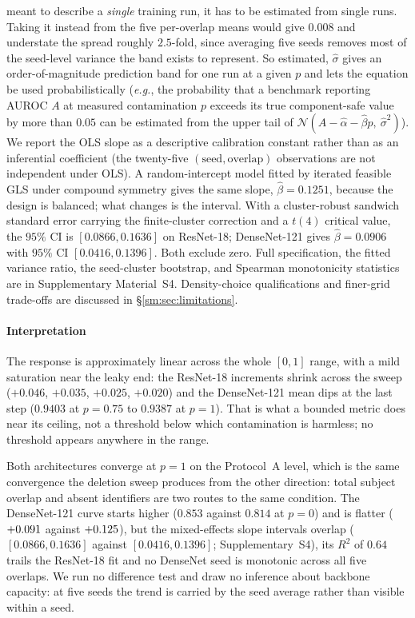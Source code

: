 \documentclass[11pt]{article}
\newcommand{\eg}{\textit{e.g.},}
\begin{document}
meant to describe a \emph{single} training run, it has to be estimated
from single runs. Taking it instead from the five per-overlap means
would give $0.008$ and understate the spread roughly $2.5$-fold, since
averaging five seeds removes most of the seed-level variance the band
exists to represent. So estimated, $\widehat{\sigma}$ gives an
order-of-magnitude prediction band for one run at a given $p$ and lets
the equation be used probabilistically (\eg{} the probability that a benchmark reporting
AUROC $A$ at measured contamination $p$ exceeds its true
component-safe value by more than $0.05$ can be estimated from the
upper tail of $\mathcal{N}(A - \widehat{\alpha} - \widehat{\beta}p,\
\widehat{\sigma}^2)$).
We report the OLS slope as a descriptive calibration constant rather
than as an inferential coefficient (the twenty-five $(\text{seed},
\text{overlap})$ observations are not independent under OLS). A
random-intercept model fitted by iterated feasible GLS under compound
symmetry gives the same slope, $\widehat{\beta} = 0.1251$, because the
design is balanced; what changes is the interval. With a
cluster-robust sandwich standard error carrying the finite-cluster
correction and a $t(4)$ critical value, the $95\%$ CI is
$[0.0866, 0.1636]$ on ResNet-18; DenseNet-121 gives
$\widehat{\beta} = 0.0906$ with $95\%$ CI $[0.0416, 0.1396]$. Both
exclude zero. Full specification, the fitted variance ratio, the
seed-cluster bootstrap, and Spearman monotonicity statistics are in
Supplementary Material~S4. Density-choice
qualifications and finer-grid trade-offs are discussed in
\S\ref{sm:sec:limitations}.



\paragraph{Interpretation}
The response is approximately linear across the whole $[0,1]$ range, with a
mild saturation near the leaky end: the ResNet-18 increments shrink across the
sweep ($+0.046$, $+0.035$, $+0.025$, $+0.020$) and the DenseNet-121 mean dips
at the last step ($0.9403$ at $p=0.75$ to $0.9387$ at $p=1$). That is what a
bounded metric does near its ceiling, not a threshold below which contamination
is harmless; no threshold appears anywhere in the range.

Both architectures converge at $p=1$ on the Protocol~A level, which is the same
convergence the deletion sweep produces from the other direction: total subject
overlap and absent identifiers are two routes to the same condition. The
DenseNet-121 curve starts higher ($0.853$ against $0.814$ at $p=0$) and is
flatter ($+0.091{}$ against $+0.125{}$), but the mixed-effects
slope intervals overlap ($[0.0866, 0.1636]$ against $[0.0416, 0.1396]$;
Supplementary~S4), its $R^2$ of $0.64$ trails the ResNet-18 fit and no DenseNet
seed is monotonic across all five overlaps. We run no difference test and draw
no inference about backbone capacity: at five seeds the trend is carried by the
seed average rather than visible within a seed.
\end{document}
